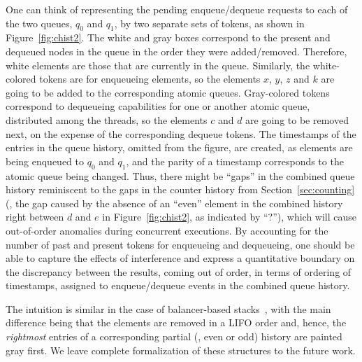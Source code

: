 %
One can think of representing the pending enqueue/dequeue requests to
each of the two queues, $q_0$ and $q_1$, by two separate sets of
tokens, as shown in Figure~\ref{fig:chist2}.
%
The white and gray boxes correspond to the present and
dequeued nodes in the queue in the order they were added/removed.
%
Therefore, white elements are those that are currently in the queue.
%
Similarly, the white-colored tokens are for enqueueing elements, so
the elements $x$, $y$, $z$ and $k$ are going to be added to the
corresponding atomic queues. Gray-colored tokens correspond to
dequeueing capabilities for one or another atomic queue, distributed
among the threads, so the elements $c$ and $d$ are going to be removed
next, on the expense of the corresponding dequeue tokens.
%
The timestamps of the entries in the queue history, omitted from the
figure, are created, as elements are being enqueued to $q_0$ and
$q_1$, and the parity of a timestamp corresponds to the atomic queue
being changed. Thus, there might be ``gaps'' in the combined queue
history reminiscent to the gaps in the counter history from
Section~\ref{sec:counting} (\eg, the gap caused by the absence of an
``even'' element in the combined history right between $d$ and $e$ in
Figure~\ref{fig:chist2}, as indicated by ``?''), which will cause
out-of-order anomalies during concurrent executions.
%
%
By accounting for the number of past and present tokens for enqueueing
and dequeueing, one should be able to capture the effects of
interference and express a quantitative boundary on the discrepancy
between the results, coming out of order, in terms of ordering of
timestamps, assigned to enqueue/dequeue events in the combined queue
history.

The intuition is similar in the case of balancer-based
stacks~\cite{Jagadeesan-Riely:ICALP14}, with the main difference being
that the elements are removed in a LIFO order and, hence, the
\emph{rightmost} entries of a corresponding partial (\ie, even or odd)
history are painted gray first.
%
We leave complete formalization of these structures to the future
work.






